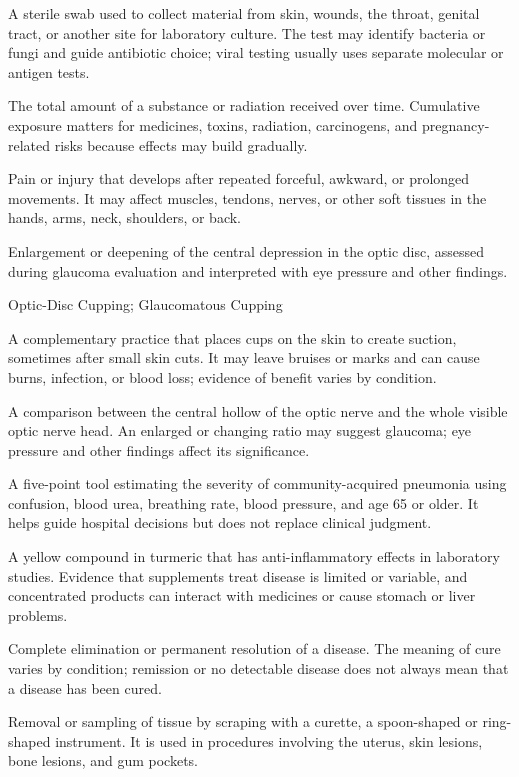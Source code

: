  A sterile swab used to collect material from skin, wounds, the throat, genital tract, or another site for laboratory culture. The test may identify bacteria or fungi and guide antibiotic choice; viral testing usually uses separate molecular or antigen tests.

 The total amount of a substance or radiation received over time. Cumulative exposure matters for medicines, toxins, radiation, carcinogens, and pregnancy-related risks because effects may build gradually.

 Pain or injury that develops after repeated forceful, awkward, or prolonged movements. It may affect muscles, tendons, nerves, or other soft tissues in the hands, arms, neck, shoulders, or back.

 Enlargement or deepening of the central depression in the optic disc, assessed during glaucoma evaluation and interpreted with eye pressure and other findings.

\synonyms
Optic-Disc Cupping; Glaucomatous Cupping

 A complementary practice that places cups on the skin to create suction, sometimes after small skin cuts. It may leave bruises or marks and can cause burns, infection, or blood loss; evidence of benefit varies by condition.

 A comparison between the central hollow of the optic nerve and the whole visible optic nerve head. An enlarged or changing ratio may suggest glaucoma; eye pressure and other findings affect its significance.

 A five-point tool estimating the severity of community-acquired pneumonia using confusion, blood urea, breathing rate, blood pressure, and age 65 or older. It helps guide hospital decisions but does not replace clinical judgment.

 A yellow compound in turmeric that has anti-inflammatory effects in laboratory studies. Evidence that supplements treat disease is limited or variable, and concentrated products can interact with medicines or cause stomach or liver problems.

 Complete elimination or permanent resolution of a disease. The meaning of cure varies by condition; remission or no detectable disease does not always mean that a disease has been cured.

 Removal or sampling of tissue by scraping with a curette, a spoon-shaped or ring-shaped instrument. It is used in procedures involving the uterus, skin lesions, bone lesions, and gum pockets.


